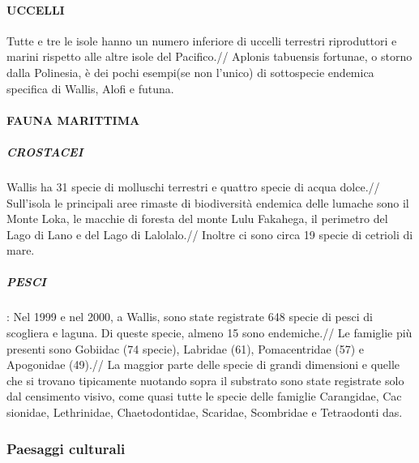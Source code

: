 \documentclass[fleqn,10pt]{SelfArx} %
\begin{document}
\paragraph{UCCELLI}
Tutte e tre le isole hanno un numero inferiore di uccelli terrestri riproduttori e marini rispetto alle altre isole del Pacifico.//
Aplonis tabuensis fortunae, o storno dalla Polinesia, è dei pochi esempi(se non l'unico) di sottospecie endemica specifica di Wallis, Alofi e futuna.
 
\paragraph{FAUNA MARITTIMA}
\subparagraph{CROSTACEI}
Wallis ha 31 specie di molluschi terrestri e quattro specie di acqua dolce.//
Sull'isola le principali aree rimaste di biodiversità endemica delle lumache sono il Monte Loka, le macchie di foresta del monte Lulu Fakahega, il perimetro del Lago di Lano e del Lago di Lalolalo.// 
Inoltre ci sono circa 19 specie di cetrioli di mare.
\subparagraph{PESCI}:
Nel 1999 e nel 2000, a Wallis, sono state registrate 648 specie di pesci di scogliera e laguna. Di queste specie, almeno 15 sono endemiche.//
Le famiglie più presenti sono Gobiidac (74 specie), Labridae (61), Pomacentridae (57) e Apogonidae (49).//
La maggior parte delle specie di grandi dimensioni e quelle che si trovano tipicamente nuotando sopra il substrato sono state registrate solo dal censimento visivo, come quasi tutte le specie delle famiglie Carangidae, Cac sionidae, Lethrinidae, Chaetodontidae, Scaridae, Scombridae e Tetraodonti das. 

\subsubsection{Paesaggi culturali}
\end{document}
